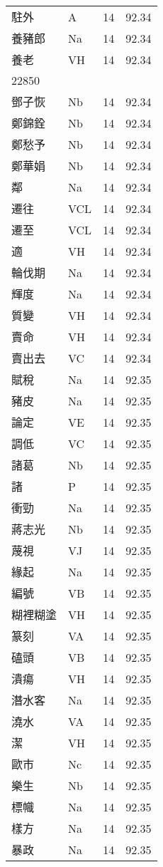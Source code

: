 \documentclass[twocolumn]{book}
\begin{document}
\begin{supertabular}{llrr}
駐外 & A & 14 &  92.34\\
養豬郎 & Na & 14 &  92.34\\
養老 & VH & 14 &  92.34\\
22850\\
鄧子恢 & Nb & 14 &  92.34\\
鄭錦銓 & Nb & 14 &  92.34\\
鄭愁予 & Nb & 14 &  92.34\\
鄭華娟 & Nb & 14 &  92.34\\
鄰 & Na & 14 &  92.34\\
遷往 & VCL & 14 &  92.34\\
遷至 & VCL & 14 &  92.34\\
適 & VH & 14 &  92.34\\
輪伐期 & Na & 14 &  92.34\\
輝度 & Na & 14 &  92.34\\
質變 & VH & 14 &  92.34\\
賣命 & VH & 14 &  92.34\\
賣出去 & VC & 14 &  92.34\\
賦稅 & Na & 14 &  92.35\\
豬皮 & Na & 14 &  92.35\\
論定 & VE & 14 &  92.35\\
調低 & VC & 14 &  92.35\\
諸葛 & Nb & 14 &  92.35\\
諸 & P & 14 &  92.35\\
衝勁 & Na & 14 &  92.35\\
蔣志光 & Nb & 14 &  92.35\\
蔑視 & VJ & 14 &  92.35\\
緣起 & Na & 14 &  92.35\\
編號 & VB & 14 &  92.35\\
糊裡糊塗 & VH & 14 &  92.35\\
篆刻 & VA & 14 &  92.35\\
磕頭 & VB & 14 &  92.35\\
潰瘍 & VH & 14 &  92.35\\
潛水客 & Na & 14 &  92.35\\
澆水 & VA & 14 &  92.35\\
潔 & VH & 14 &  92.35\\
歐市 & Nc & 14 &  92.35\\
樂生 & Nb & 14 &  92.35\\
標幟 & Na & 14 &  92.35\\
樣方 & Na & 14 &  92.35\\
暴政 & Na & 14 &  92.35\\

\end{supertabular}
\end{document}
